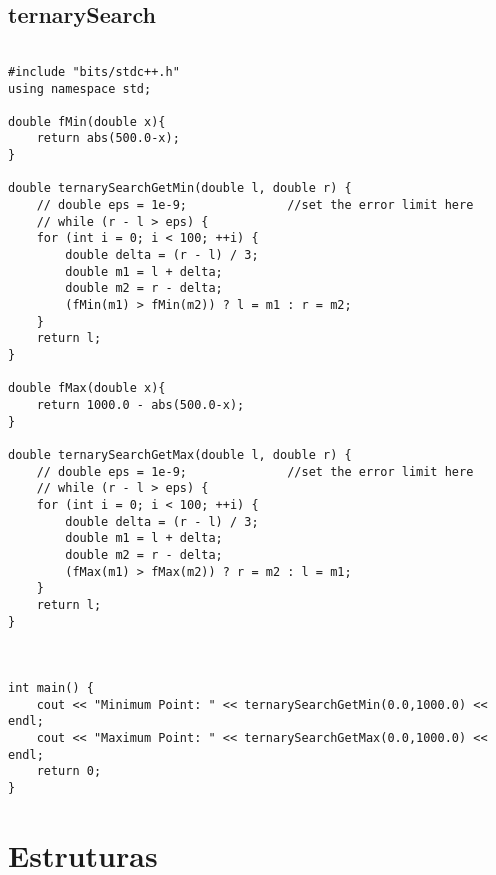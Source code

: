 \documentclass[landscape,twocolumn,10pt,a4paper]{article}
\begin{document}
\subsection{ternarySearch}
\begin{verbatim}

#include "bits/stdc++.h"
using namespace std;

double fMin(double x){
    return abs(500.0-x);
}

double ternarySearchGetMin(double l, double r) {
    // double eps = 1e-9;              //set the error limit here
    // while (r - l > eps) {
    for (int i = 0; i < 100; ++i) {
        double delta = (r - l) / 3;
        double m1 = l + delta;
        double m2 = r - delta;
        (fMin(m1) > fMin(m2)) ? l = m1 : r = m2;
    }
    return l;
}

double fMax(double x){
    return 1000.0 - abs(500.0-x);
}

double ternarySearchGetMax(double l, double r) {
    // double eps = 1e-9;              //set the error limit here
    // while (r - l > eps) {
    for (int i = 0; i < 100; ++i) {
        double delta = (r - l) / 3;
        double m1 = l + delta;
        double m2 = r - delta;
        (fMax(m1) > fMax(m2)) ? r = m2 : l = m1;
    }
    return l;
}



int main() {
    cout << "Minimum Point: " << ternarySearchGetMin(0.0,1000.0) << endl;
    cout << "Maximum Point: " << ternarySearchGetMax(0.0,1000.0) << endl;
    return 0;
}\end{verbatim}

\section{Estruturas}
\end{document}
